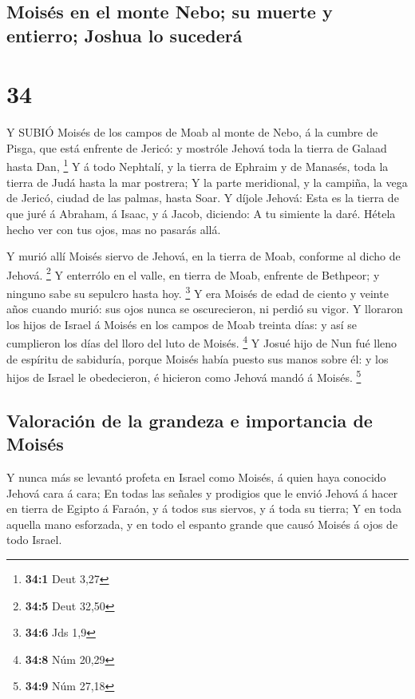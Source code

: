 \hypertarget{moisuxe9s-en-el-monte-nebo-su-muerte-y-entierro-joshua-lo-sucederuxe1}{%
\subsection{Moisés en el monte Nebo; su muerte y entierro; Joshua lo
sucederá}\label{moisuxe9s-en-el-monte-nebo-su-muerte-y-entierro-joshua-lo-sucederuxe1}}

\hypertarget{section-33}{%
\section{34}\label{section-33}}

 Y SUBIÓ Moisés de los campos de Moab al monte de Nebo, á la
cumbre de Pisga, que está enfrente de Jericó: y mostróle Jehová toda la
tierra de Galaad hasta Dan, \footnote{\textbf{34:1} Deut 3,27}
 Y á todo Nephtalí, y la tierra de Ephraim y de Manasés,
toda la tierra de Judá hasta la mar postrera;  Y la parte
meridional, y la campiña, la vega de Jericó, ciudad de las palmas, hasta
Soar.  Y díjole Jehová: Esta es la tierra de que juré á
Abraham, á Isaac, y á Jacob, diciendo: A tu simiente la daré. Hétela
hecho ver con tus ojos, mas no pasarás allá.

 Y murió allí Moisés siervo de Jehová, en la tierra de Moab,
conforme al dicho de Jehová. \footnote{\textbf{34:5} Deut 32,50}
 Y enterrólo en el valle, en tierra de Moab, enfrente de
Bethpeor; y ninguno sabe su sepulcro hasta hoy. \footnote{\textbf{34:6}
  Jds 1,9}  Y era Moisés de edad de ciento y veinte años
cuando murió: sus ojos nunca se oscurecieron, ni perdió su vigor.
 Y lloraron los hijos de Israel á Moisés en los campos de
Moab treinta días: y así se cumplieron los días del lloro del luto de
Moisés. \footnote{\textbf{34:8} Núm 20,29}  Y Josué hijo de
Nun fué lleno de espíritu de sabiduría, porque Moisés había puesto sus
manos sobre él: y los hijos de Israel le obedecieron, é hicieron como
Jehová mandó á Moisés. \footnote{\textbf{34:9} Núm 27,18}

\hypertarget{valoraciuxf3n-de-la-grandeza-e-importancia-de-moisuxe9s}{%
\subsection{Valoración de la grandeza e importancia de
Moisés}\label{valoraciuxf3n-de-la-grandeza-e-importancia-de-moisuxe9s}}

 Y nunca más se levantó profeta en Israel como Moisés, á
quien haya conocido Jehová cara á cara;  En todas las
señales y prodigios que le envió Jehová á hacer en tierra de Egipto á
Faraón, y á todos sus siervos, y á toda su tierra;  Y en
toda aquella mano esforzada, y en todo el espanto grande que causó
Moisés á ojos de todo Israel.
